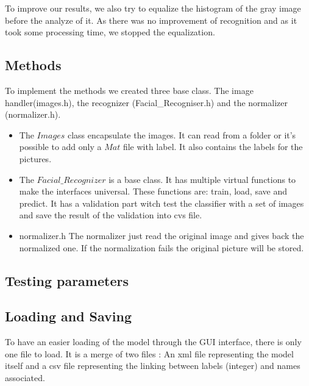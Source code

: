 To improve our results, we also try to equalize the histogram of the gray image before the analyze of it. As there was no improvement of recognition and as it took some processing time, we stopped the equalization.

\subsection{Methods}

To implement the methods we created three base class. The image handler(images.h), the recognizer (Facial\_Recogniser.h) and the normalizer (normalizer.h).
\begin{itemize}
	\item The $Images$ class encapsulate the images. It can read from a folder or it's possible to add only a $Mat$ file with label. It also contains the labels for the pictures.
	
	\item The $Facial\_Recognizer$ is a base class. It has multiple virtual functions to make the interfaces universal. These functions are: train, load, save and predict. It has a validation part witch test the classifier with a set of images and save the result of the validation into cvs file.
	
	\item normalizer.h
	The normalizer just read the original image and gives back the normalized one. If the normalization fails the original picture will be stored.
	
\end{itemize}

\subsection{Testing parameters}

\subsection{Loading and Saving}
To have an easier loading of the model through the GUI interface, there is only one file to load. It is a merge of two files : An xml file representing the model itself and a csv file representing the linking between labels (integer) and names associated.
